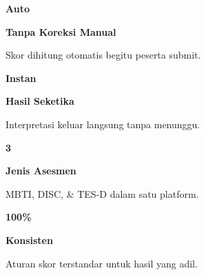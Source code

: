 \documentclass[a4paper]{article}
\begin{document}
\noindent
\begin{minipage}[t]{0.485\textwidth}
    \noindent\colorbox{BlueBg}{%
        \begin{minipage}[t][2.7cm][c]{\dimexpr\linewidth-2\fboxsep\relax}
            \centering
            {\fontsize{20}{24}\selectfont\bfseries\color{BluePrimary} Auto}\par\vspace{2pt}
            {\fontsize{9.5}{12}\selectfont\bfseries\color{BlueDark} Tanpa Koreksi Manual}\par\vspace{2pt}
            {\fontsize{8.5}{11}\selectfont\color{TextDark}Skor dihitung otomatis begitu peserta submit.}
        \end{minipage}}\par
    \vspace{6pt}
    \noindent\colorbox{BlueBg}{%
        \begin{minipage}[t][2.7cm][c]{\dimexpr\linewidth-2\fboxsep\relax}
            \centering
            {\fontsize{20}{24}\selectfont\bfseries\color{BluePrimary} Instan}\par\vspace{2pt}
            {\fontsize{9.5}{12}\selectfont\bfseries\color{BlueDark} Hasil Seketika}\par\vspace{2pt}
            {\fontsize{8.5}{11}\selectfont\color{TextDark}Interpretasi keluar langsung tanpa menunggu.}
        \end{minipage}}%
\end{minipage}%
\hfill
\begin{minipage}[t]{0.485\textwidth}
    \noindent\colorbox{BlueBg}{%
        \begin{minipage}[t][2.7cm][c]{\dimexpr\linewidth-2\fboxsep\relax}
            \centering
            {\fontsize{20}{24}\selectfont\bfseries\color{BluePrimary} 3}\par\vspace{2pt}
            {\fontsize{9.5}{12}\selectfont\bfseries\color{BlueDark} Jenis Asesmen}\par\vspace{2pt}
            {\fontsize{8.5}{11}\selectfont\color{TextDark}MBTI, DISC, \& TES-D dalam satu platform.}
        \end{minipage}}\par
    \vspace{6pt}
    \noindent\colorbox{BlueBg}{%
        \begin{minipage}[t][2.7cm][c]{\dimexpr\linewidth-2\fboxsep\relax}
            \centering
            {\fontsize{20}{24}\selectfont\bfseries\color{BluePrimary} 100\%}\par\vspace{2pt}
            {\fontsize{9.5}{12}\selectfont\bfseries\color{BlueDark} Konsisten}\par\vspace{2pt}
            {\fontsize{8.5}{11}\selectfont\color{TextDark}Aturan skor terstandar untuk hasil yang adil.}
        \end{minipage}}%
\end{minipage}
\end{document}
